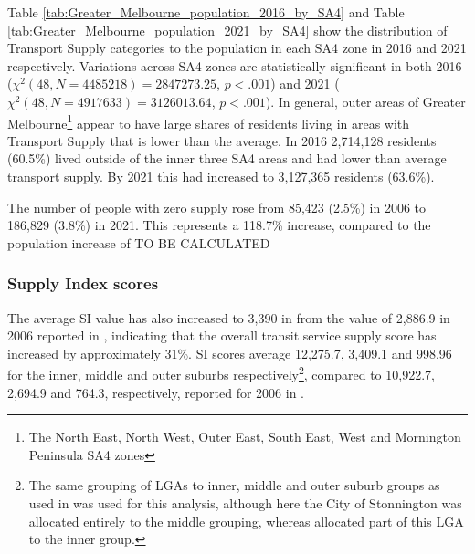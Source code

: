 \documentclass[preprint, 3p,
authoryear]{elsarticle} %
\begin{document}
Table \ref{tab:Greater_Melbourne_population_2016_by_SA4} and Table
\ref{tab:Greater_Melbourne_population_2021_by_SA4} show the distribution
of Transport Supply categories to the population in each SA4 zone in
2016 and 2021 respectively. Variations across SA4 zones are
statistically significant in both 2016
(\(\chi^2(48, N = 4485218) = 2847273.25\), \(p < .001\)) and 2021
(\(\chi^2(48, N = 4917633) = 3126013.64\), \(p < .001\)). In general,
outer areas of Greater Melbourne\footnote{The North East, North West,
  Outer East, South East, West and Mornington Peninsula SA4 zones}
appear to have large shares of residents living in areas with Transport
Supply that is lower than the average. In 2016 2,714,128 residents
(60.5\%) lived outside of the inner three SA4 areas and had lower than
average transport supply. By 2021 this had increased to 3,127,365
residents (63.6\%).

The number of people with zero supply rose from 85,423 (2.5\%) in 2006
to 186,829 (3.8\%) in 2021. This represents a 118.7\% increase, compared
to the population increase of TO BE CALCULATED

\subsubsection{Supply Index scores}\label{supply-index-scores}

The average SI value has also increased to 3,390 in from the value of
2,886.9 in 2006 reported in \citet{currie2010identifying}, indicating
that the overall transit service supply score has increased by
approximately 31\%. SI scores average 12,275.7, 3,409.1 and 998.96 for
the inner, middle and outer suburbs respectively\footnote{The same
  grouping of LGAs to inner, middle and outer suburb groups as used in
  \citet{currie2010identifying} was used for this analysis, although
  here the City of Stonnington was allocated entirely to the middle
  grouping, whereas \citet{currie2010identifying} allocated part of this
  LGA to the inner group.}, compared to 10,922.7, 2,694.9 and 764.3,
respectively, reported for 2006 in \citet{currie2010identifying}.
\end{document}
